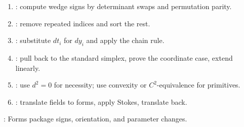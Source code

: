 \begin{method} \label{meth:forms-manifolds-proof-patterns-source-todo}\label{meth:differential-forms-proof-patterns} 
\begin{enumerate}[label=(\roman*)]
\setlength{\itemsep}{0pt}
\item {}: compute wedge signs by determinant swaps and permutation parity.
\item {}: remove repeated indices and sort the rest.
\item {}: substitute $dt_i$ for $dy_i$ and apply the chain rule.
\item {}: pull back to the standard simplex, prove the coordinate case, extend linearly.
\item {}: use $d^2=0$ for necessity; use convexity or $C^2$-equivalence for primitives.
\item {}: translate fields to forms, apply Stokes, translate back.
\end{enumerate}
: Forms package signs, orientation, and parameter changes.
\end{method}
